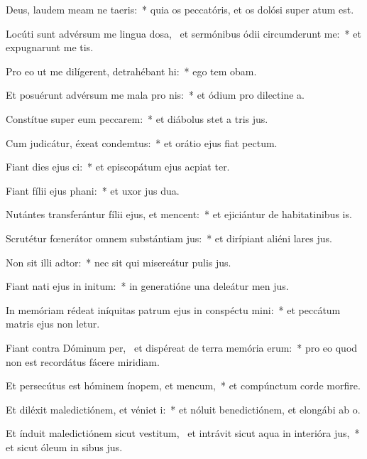 \item Deus, laudem meam ne taeris:~* quia os peccatóris, et os dolósi super  atum est.
\item Locúti sunt advérsum me lingua dosa,~\pscross{} et sermónibus ódii circumderunt me:~* et expugnarunt me tis.
\item Pro eo ut me dilígerent, detrahébant hi:~* ego tem obam.
\item Et posuérunt advérsum me mala pro nis:~* et ódium pro dilectine a.
\item Constítue super eum peccarem:~* et diábolus stet a tris jus.
\item Cum judicátur, éxeat condemtus:~* et orátio ejus fiat  pectum.
\item Fiant dies ejus ci:~* et episcopátum ejus acpiat ter.
\item Fiant fílii ejus phani:~* et uxor jus dua.
\item Nutántes transferántur fílii ejus, et mencent:~* et ejiciántur de habitatinibus is.
\item Scrutétur fœnerátor omnem substántiam jus:~* et dirípiant aliéni lares jus.
\item Non sit illi adtor:~* nec sit qui misereátur pulis jus.
\item Fiant nati ejus in initum:~* in generatióne una deleátur men jus.
\item In memóriam rédeat iníquitas patrum ejus in conspéctu mini:~* et peccátum matris ejus non letur.
\item Fiant contra Dóminum per,~\pscross{} et dispéreat de terra memória erum:~* pro eo quod non est recordátus fácere miridiam.
\item Et persecútus est hóminem ínopem, et mencum,~* et compúnctum corde morfire.
\item Et diléxit maledictiónem, et véniet i:~* et nóluit benedictiónem, et elongábi ab o.
\item Et índuit maledictiónem sicut vestitum,~\pscross{} et intrávit sicut aqua in interióra jus,~* et sicut óleum in sibus jus.
